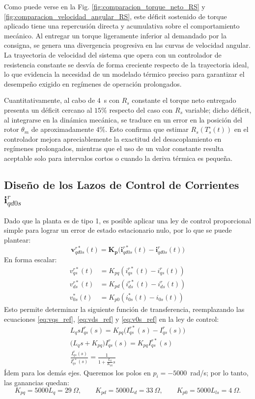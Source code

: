 \documentclass[12pt, a4paper,journal, onecolumn, compsoc]{IEEEtran}
\begin{document}
Como puede verse en la Fig. \ref{fig:comparacion_torque_neto_RS} y \ref{fig:comparacion_velocidad_angular_RS}, este déficit sostenido de torque aplicado tiene una repercusión directa y acumulativa sobre el comportamiento mecánico. Al entregar un torque ligeramente inferior al demandado por la consigna, se genera una divergencia progresiva en las curvas de velocidad angular. La trayectoria de velocidad del sistema que opera con un controlador de resistencia constante se desvía de forma creciente respecto de la trayectoria ideal, lo que evidencia la necesidad de un modelado térmico preciso para garantizar el desempeño exigido en regímenes de operación prolongados.

Cuantitativamente, al cabo de $4$~s con $R_s$ constante el torque neto entregado presenta un déficit cercano al $15\%$ respecto del caso con $R_s$ variable; dicho déficit, al integrarse en la dinámica mecánica, se traduce en un error en la posición del rotor $\theta_m$ de aproximadamente $4\%$. Esto confirma que estimar $R_s(T_s^\circ(t))$ en el controlador mejora apreciablemente la exactitud del desacoplamiento en regímenes prolongados, mientras que el uso de un valor constante resulta aceptable solo para intervalos cortos o cuando la deriva térmica es pequeña.
\subsection{Diseño de los Lazos de Control de Corrientes $\bm{i}_{qd0s}^r$}
Dado que la planta es de tipo 1, es posible aplicar una ley de control proporcional simple para lograr un error de estado estacionario nulo, por lo que se puede plantear:
\begin{equation}
    \bm{v}_{qd0s}^{r*}(t) = \bm{K_p} \big(\bm{i}_{qd0s}^{r*}(t)-\bm{i}_{qd0s}^{r}(t)\big)
\end{equation}
En forma escalar:
\begin{equation*}
\begin{aligned}
v_{qs}^{r*}(t) &= K_{pq} \left(i_{qs}^{r*}(t) - i_{qs}^{r}(t)\right) \\
v_{ds}^{r*}(t) &= K_{pd} \left(i_{ds}^{r*}(t) - i_{ds}^{r}(t)\right) \\
v_{0s}^{*}(t) &= K_{p0} \left(i_{0s}^{*}(t) - i_{0s}(t)\right)
\end{aligned}
\end{equation*}
Esto permite determinar la siguiente función de transferencia, reemplazando las ecuaciones \eqref{eq:vqs_ref}, \eqref{eq:vds_ref} y \eqref{eq:v0s_ref} en la ley de control:
\begin{gather*}
    L_qsI_{qs}^r(s) = K_{pq}\big(I_{qs}^{r*}(s)-I_{qs}^{r}(s)\big) \\ 
    \Big(L_qs+K_{pq}\Big)I_{qs}^r(s)=K_{pq}I_{qs}^{r*}(s) \\
    \frac{I_{qs}^r(s)}{I_{qs}^{r*}(s)} = \frac{1}{1+\frac{L_q}{K_{pq}}s}
\end{gather*}
Ídem para los demás ejes.
Queremos los polos en $p_i=-5000$~rad/s; por lo tanto, las ganancias quedan:
\[
K_{pq}=5000L_q=29~\Omega, \qquad
K_{pd}=5000L_d=33~\Omega, \qquad
K_{p0}=5000L_{ls}=4~\Omega.
\]
\end{document}
